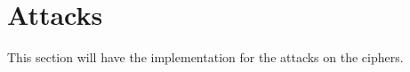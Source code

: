 \section{Attacks}\label{sec:Main}

This section will have the implementation for the attacks on the ciphers.




